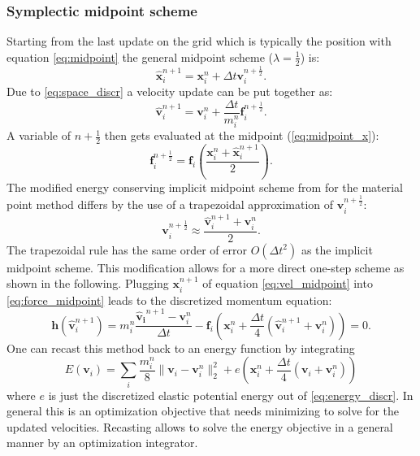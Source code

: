 \documentclass[m,times]{cgMA}
\begin{document}
\subsubsection{Symplectic midpoint scheme}
Starting from the last update on the grid which is typically the position with equation \ref{eq:midpoint} the general midpoint scheme ($\lambda=\frac{1}{2}$) is:
\begin{equation}\label{eq:vel_midpoint}
  \boldsymbol{\hat{x}}_i^{n+1}   =\boldsymbol{x}_i^{n} + \Delta t \boldsymbol{v}_i^{n+\frac{1}{2}}.
\end{equation}
Due to \ref{eq:space_discr} a velocity update can be put together as:
\begin{equation}\label{eq:force_midpoint}
\boldsymbol{\hat{v}}^{n+1}_i
= \boldsymbol{v}^n_i+ \frac{\Delta t}{m_i^n}\boldsymbol{f}_i^{n+\frac{1}{2}}.
\end{equation}
A variable of $n+\frac{1}{2}$ then gets evaluated at the midpoint (\ref{eq:midpoint_x}):
\begin{equation}
  \boldsymbol{f}^{n+\frac{1}{2}}_i =  \boldsymbol{f}_i\left(\frac{\boldsymbol{x}_i^n + \boldsymbol{\hat{x}}_i^{n+1}}{2}\right).
\end{equation}
The modified energy conserving implicit midpoint scheme from \cite{GONZALEZ} for the material point method differs by the use of a trapezoidal approximation of $\boldsymbol{v}_i^{n+\frac{1}{2}}$:
\begin{equation}\label{eq:trapezoidal}
  \boldsymbol{v}_i^{n+\frac{1}{2}} \approx \frac{\boldsymbol{\hat{v}}_i^{n+1} + \boldsymbol{v}_i^{n}}{2}.
\end{equation}
The trapezoidal rule has the same order of error $O(\Delta t^2)$ as the implicit midpoint scheme. This modification allows for a more direct one-step scheme as shown in the following. Plugging $\boldsymbol{x}_i^{n+1}$ of equation \ref{eq:vel_midpoint} into \ref{eq:force_midpoint} leads to the discretized momentum equation:
\begin{equation}
  \boldsymbol{h}(\boldsymbol{\hat{v}}_i^{n+1}) = m_i^n \frac{\boldsymbol{\hat{v}_i}^{n+1}-\boldsymbol{v}_i^n}{\Delta t} - \boldsymbol{f}_i\left(\boldsymbol{x}_i^n + \frac{\Delta t}{4} (\boldsymbol{\hat{v}}_i^{n+1} + \boldsymbol{v}_i^{n})\right) = 0.
\end{equation}
One can recast this method back to an energy function by integrating
\begin{equation}
  E(\boldsymbol{v}_i) = \sum_i \frac{m_i^n}{8} \|\boldsymbol{v}_i - \boldsymbol{v}_i^n\|^2_2 + e(\boldsymbol{x}_i^n + \frac{\Delta t}{4}(\boldsymbol{v}_i + \boldsymbol{v}_i^n))
\end{equation}
where $e$ is just the discretized elastic potential energy out of \ref{eq:energy_discr}. In general this is an optimization objective that needs minimizing to solve for the updated velocities. Recasting allows to solve the energy objective in a general manner by an optimization integrator.
\end{document}
